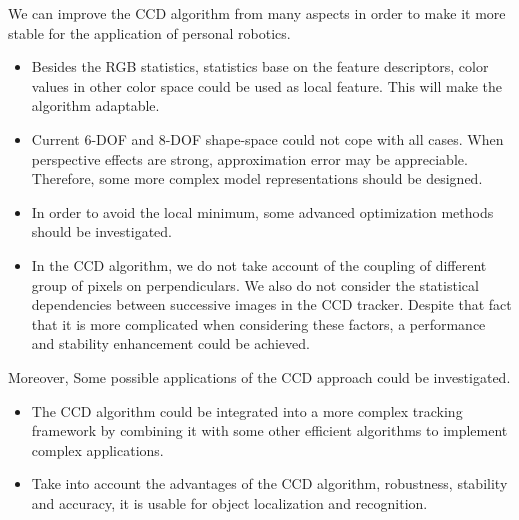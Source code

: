 We can improve the CCD algorithm from many aspects in order to make it
more stable for the application of personal robotics.
\begin{itemize}
\item Besides the RGB statistics, statistics base on the feature
  descriptors, color values in other color space could be used as
  local feature. This will make the algorithm adaptable.
\item Current 6-DOF and 8-DOF shape-space could not cope with all
  cases. When perspective effects are strong, approximation error
may be appreciable. Therefore, some more complex model representations
should be designed.
\item In order to avoid the local minimum, some advanced optimization
  methods should be investigated.
\item In the CCD algorithm, we do not take account of
  the coupling of different group of pixels on perpendiculars. We also
  do not consider the statistical dependencies between successive
  images in the CCD tracker. Despite that fact that it is more
  complicated when considering these factors, a performance and
  stability enhancement could be achieved.
\end{itemize}

Moreover, Some possible applications of the CCD approach could be
investigated.
\begin{itemize}
\item The CCD algorithm could be integrated into a more complex
  tracking framework by combining it with some other efficient
  algorithms to implement complex applications.
\item Take into account the advantages of the CCD algorithm,
  robustness, stability and accuracy, it is usable for object
  localization and recognition.
\end{itemize}
